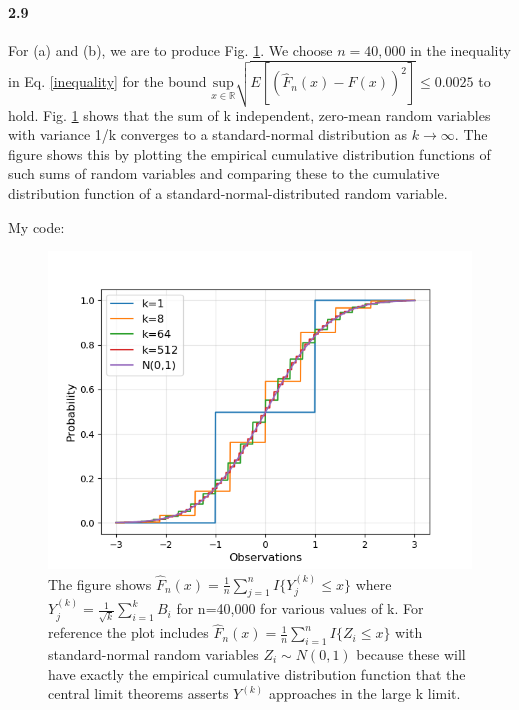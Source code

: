 \documentclass{article}
\begin{document}
\paragraph{2.9}
For (a) and (b), we are to produce Fig. \ref{fig:plot9}. We choose $n=40,000$ in the inequality in Eq. \ref{inequality} for the bound $\underset{x \in \mathds{R}}{\text{sup}} \sqrt{E[(\hat{F}_n(x)-F(x))^2]} \le 0.0025$ to hold. Fig. \ref{fig:plot9} shows that the sum of k independent, zero-mean random variables with variance 1/k converges to a standard-normal distribution as $k\longrightarrow\infty$. The figure shows this by plotting the empirical cumulative distribution functions of such sums of random variables and comparing these to the cumulative distribution function of a standard-normal-distributed random variable.

My code:

\begin{figure}[h]
  \includegraphics[width=0.75\linewidth]{plot_hw0p9.png}
  \caption{The figure shows $\hat{F}_n(x)=\frac{1}{n} \sum_{j=1}^{n} I\{Y^{(k)}_j\le x\}$ where $Y^{(k)}_j=\frac{1}{\sqrt{k}}\sum_{i=1}^{k}{B_i}$ for n=40,000 for various values of k. For reference the plot includes $\hat{F}_n(x)=\frac{1}{n} \sum_{i=1}^{n} I\{Z_i\le x\}$ with standard-normal random variables $Z_i \sim N(0,1)$ because these will have exactly the empirical cumulative distribution function that the central limit theorems asserts $Y^{(k)}$ approaches in the large k limit.}
  \label{fig:plot9}
\end{figure}
\end{document}
